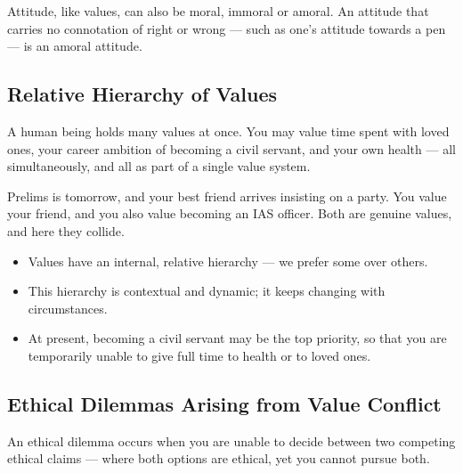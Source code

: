 \begin{KeyConcept}
Attitude, like values, can also be moral, immoral or amoral. An attitude that carries no connotation of right or wrong --- such as one's attitude towards a pen --- is an amoral attitude.
\end{KeyConcept}

\subsection{Relative Hierarchy of Values}

A human being holds many values at once. You may value time spent with loved ones, your career ambition of becoming a civil servant, and your own health --- all simultaneously, and all as part of a single value system.

\begin{ExampleBox}
Prelims is tomorrow, and your best friend arrives insisting on a party. You value your friend, and you also value becoming an IAS officer. Both are genuine values, and here they collide.
\end{ExampleBox}

\begin{KeyConcept}
\begin{itemize}
\item Values have an internal, relative hierarchy --- we prefer some over others.
\item This hierarchy is contextual and dynamic; it keeps changing with circumstances.
\item At present, becoming a civil servant may be the top priority, so that you are temporarily unable to give full time to health or to loved ones.
\end{itemize}
\end{KeyConcept}

\subsection{Ethical Dilemmas Arising from Value Conflict}

An ethical dilemma occurs when you are unable to decide between two competing ethical claims --- where both options are ethical, yet you cannot pursue both.


